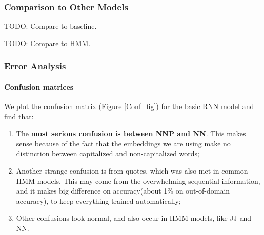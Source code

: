 \documentclass[11pt]{article}
\begin{document}
\subsubsection{Comparison to Other Models}



TODO: Compare to baseline.

TODO: Compare to HMM.

\subsubsection{Error Analysis}  \label{sec:confm}

\paragraph{Confusion matrices}
We plot the confusion matrix (Figure \ref{Conf_fig}) for the basic RNN model and find that:
\begin{enumerate}
\item The \textbf{most serious confusion is between NNP and NN}. This makes sense because of the fact that the embeddings we are using make no distinction between capitalized and non-capitalized words;
\item  Another strange confusion is from quotes, which was also met in common HMM models. This may come from the overwhelming sequential information, and it makes big difference on accuracy(about 1\% on out-of-domain accuracy), to keep everything trained automatically;
\item Other confusions look normal, and also occur in HMM models, like JJ and NN.
\end{enumerate}
\end{document}
